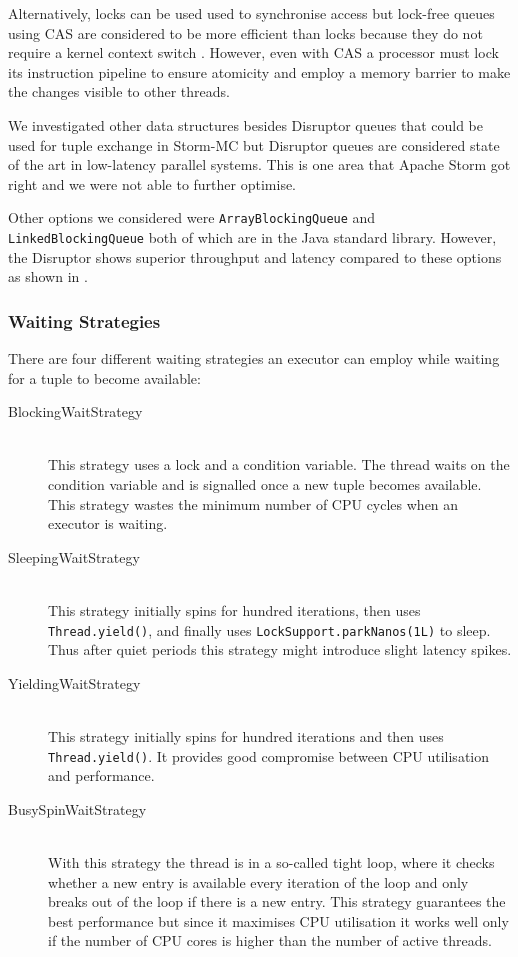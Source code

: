 Alternatively, locks can be used used to synchronise access but lock-free queues using CAS are considered to be more efficient than locks because they do not require a kernel context switch \cite{Thompson_Farley_Barker_Gee_Stewart_2011}. However, even with CAS a processor must lock its instruction pipeline to ensure atomicity and employ a memory barrier to make the changes visible to other threads.

We investigated other data structures besides Disruptor queues that could be used for tuple exchange in Storm-MC but Disruptor queues are considered state of the art in low-latency parallel systems. This is one area that Apache Storm got right and we were not able to further optimise.

Other options we considered were \texttt{ArrayBlockingQueue} and \texttt{LinkedBlockingQueue} both of which are in the Java standard library. However, the Disruptor shows superior throughput and latency compared to these options as shown in \citep{DisruptorWiki}.

\subsubsection{Waiting Strategies}
\label{subsubsec:waiting}

There are four different waiting strategies an executor can employ while waiting for a tuple to become available:

\begin{description}
	\item[BlockingWaitStrategy] \hfill \\
	This strategy uses a lock and a condition variable. The thread waits on the condition variable and is signalled once a new tuple becomes available. This strategy wastes the minimum number of CPU cycles when an executor is waiting.
	\item[SleepingWaitStrategy] \hfill \\
	This strategy initially spins for hundred iterations, then uses \texttt{Thread.yield()}, and finally uses \texttt{LockSupport.parkNanos(1L)} to sleep. Thus after quiet periods this strategy might introduce slight latency spikes.
	\item[YieldingWaitStrategy] \hfill \\
	This strategy initially spins for hundred iterations and then uses \texttt{Thread.yield()}. It provides good compromise between CPU utilisation and performance.
	\item[BusySpinWaitStrategy] \hfill \\
	With this strategy the thread is in a so-called tight loop, where it checks whether a new entry is available every iteration of the loop and only breaks out of the loop if there is a new entry. This strategy guarantees the best performance but since it maximises CPU utilisation it works well only if the number of CPU cores is higher than the number of active threads.
\end{description}

